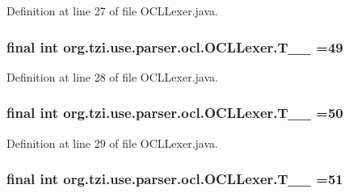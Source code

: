 Definition at line 27 of file O\-C\-L\-Lexer.\-java.

\hypertarget{classorg_1_1tzi_1_1use_1_1parser_1_1ocl_1_1_o_c_l_lexer_a097664c1598956897c1ef5ecc5f543f4}{
\subsubsection[{T\-\_\-\-\_\-49}]{\setlength{\rightskip}{0pt plus 5cm}final int org.\-tzi.\-use.\-parser.\-ocl.\-O\-C\-L\-Lexer.\-T\-\_\-\-\_ =49\hspace{0.3cm}{\ttfamily [static]}}}\label{classorg_1_1tzi_1_1use_1_1parser_1_1ocl_1_1_o_c_l_lexer_a097664c1598956897c1ef5ecc5f543f4}


Definition at line 28 of file O\-C\-L\-Lexer.\-java.

\hypertarget{classorg_1_1tzi_1_1use_1_1parser_1_1ocl_1_1_o_c_l_lexer_a0c432afe17ff4701db5a047f107715f3}{
\subsubsection[{T\-\_\-\-\_\-50}]{\setlength{\rightskip}{0pt plus 5cm}final int org.\-tzi.\-use.\-parser.\-ocl.\-O\-C\-L\-Lexer.\-T\-\_\-\-\_ =50\hspace{0.3cm}{\ttfamily [static]}}}\label{classorg_1_1tzi_1_1use_1_1parser_1_1ocl_1_1_o_c_l_lexer_a0c432afe17ff4701db5a047f107715f3}


Definition at line 29 of file O\-C\-L\-Lexer.\-java.

\hypertarget{classorg_1_1tzi_1_1use_1_1parser_1_1ocl_1_1_o_c_l_lexer_a0e687fc9fa69e0718ad6d7bcfd4a1149}{
\subsubsection[{T\-\_\-\-\_\-51}]{\setlength{\rightskip}{0pt plus 5cm}final int org.\-tzi.\-use.\-parser.\-ocl.\-O\-C\-L\-Lexer.\-T\-\_\-\-\_ =51\hspace{0.3cm}{\ttfamily [static]}}}\label{classorg_1_1tzi_1_1use_1_1parser_1_1ocl_1_1_o_c_l_lexer_a0e687fc9fa69e0718ad6d7bcfd4a1149}



